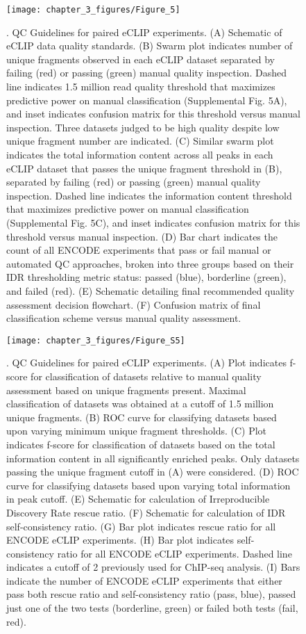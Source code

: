\begin{figure}[ht]
  \centering
  \texttt{[image: chapter\_3\_figures/Figure\_5]}
  \caption[Figure 5]{. QC Guidelines for paired eCLIP experiments. (A) Schematic of eCLIP data quality standards. (B) Swarm plot indicates number of unique fragments observed in each eCLIP dataset separated by failing (red) or passing (green) manual quality inspection. Dashed line indicates 1.5 million read quality threshold that maximizes predictive power on manual classification (Supplemental Fig. 5A), and inset indicates confusion matrix for this threshold versus manual inspection. Three datasets judged to be high quality despite low unique fragment number are indicated. (C) Similar swarm plot indicates the total information content across all peaks in each eCLIP dataset that passes the unique fragment threshold in (B), separated by failing (red) or passing (green) manual quality inspection. Dashed line indicates the information content threshold that maximizes predictive power on manual classification (Supplemental Fig. 5C), and inset indicates confusion matrix for this threshold versus manual inspection. (D) Bar chart indicates the count of all ENCODE experiments that pass or fail manual or automated QC approaches, broken into three groups based on their IDR thresholding metric status: passed (blue), borderline (green), and failed (red). (E) Schematic detailing final recommended quality assessment decision flowchart. (F) Confusion matrix of final classification scheme versus manual quality assessment.}
  \label{fig:Figure_5}
\end{figure}

\begin{figure}[ht]
  \centering
  \texttt{[image: chapter\_3\_figures/Figure\_S5]}
  \caption[Supplementary Figure 5]{. QC Guidelines for paired eCLIP experiments. (A) Plot indicates f-score for classification of datasets relative to manual quality assessment based on unique fragments present. Maximal classification of datasets was obtained at a cutoff of 1.5 million unique fragments. (B) ROC curve for classifying datasets based upon varying minimum unique fragment thresholds. (C) Plot indicates f-score for classification of datasets based on the total information content in all significantly enriched peaks. Only datasets passing the unique fragment cutoff in (A) were considered. (D) ROC curve for classifying datasets based upon varying total information in peak cutoff. (E) Schematic for calculation of Irreproducible Discovery Rate rescue ratio. (F) Schematic for calculation of IDR self-consistency ratio. (G) Bar plot indicates rescue ratio for all ENCODE eCLIP experiments. (H) Bar plot indicates self-consistency ratio for all ENCODE eCLIP experiments. Dashed line indicates a cutoff of 2 previously used for ChIP-seq analysis. (I) Bars indicate the number of ENCODE eCLIP experiments that either pass both rescue ratio and self-consistency ratio (pass, blue), passed just one of the two tests (borderline, green) or failed both tests (fail, red).}
  \label{fig:Figure_S5}
\end{figure}

